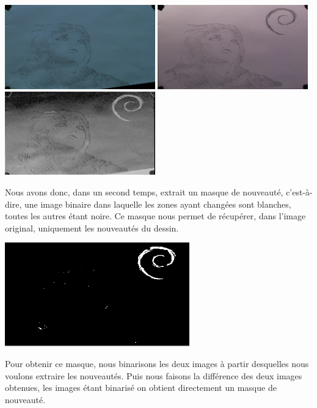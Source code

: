 \begin{center}
\includegraphics[width=6.5cm]{images/capImage1-7.png}
\includegraphics[width=6.5cm]{images/capImage1-9.png}
\hfill\includegraphics[width=6.5cm]{images/simpleDiff.png}\newline
{}
\end{center}

Nous avons donc, dans un second temps, extrait un masque de nouveauté, c'est-à-dire, une image binaire dans laquelle les zones ayant changées sont blanches, toutes les autres étant noire. Ce masque nous permet de récupérer, dans l'image original, uniquement les nouveautés du dessin.


\begin{center}
\includegraphics[width=8cm]{images/masqueDiff.png}\newline
{}
\end{center}

Pour obtenir ce masque, nous binarisons les deux images à partir desquelles nous voulons extraire les nouveautés. Puis nous faisons la différence des deux images obtenues, les images étant binarisé on obtient directement un masque de nouveauté.


